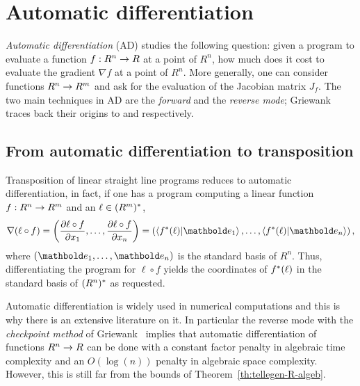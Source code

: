 

\section{Automatic differentiation}
\label{sec:autom-diff}

\emph{Automatic differentiation}
(AD) studies the following
question: given a program to evaluate a function $f:R^n\rightarrow R$ at a
point of $R^n$, how much does it cost to evaluate the gradient $\nabla
f$ at a point of $R^n$. More generally, one can consider functions
$R^n\rightarrow R^m$ and ask for the evaluation of the Jacobian matrix
$J_f$. The two main techniques in AD are the
\emph{forward}
and the
\emph{reverse
  mode}; Griewank~\cite{griewank2008evaluating} traces back their
origins to \cite{beda59} and \cite{ostrowski+al71} respectively.

\subsection{From automatic differentiation to transposition}
\label{sec:from-autom-diff}
Transposition of linear straight line programs reduces to automatic
differentiation, in fact, if one has a program computing a linear
function $f:R^n\rightarrow R^m$ and an $\ell\in(R^m)^\ast$,
\begin{equation}
  \label{eq:261}
  \nabla (\ell\circ f) =
  \left(\frac{\partial \ell\circ f}{\partial x_1},\ldots,\frac{\partial \ell\circ f}{\partial x_n}\right) =
  \left(\braket{\dual{f}(\ell)}{\basis{e}_1},\ldots,\braket{\dual{f}(\ell)}{\basis{e}_n}\right)
  \text{,}
\end{equation}
where $(\basis{e}_1,\ldots,\basis{e}_n)$ is the standard basis of
$R^n$. Thus, differentiating the program for $\ell\circ f$ yields the
coordinates of $f^\ast(\ell)$ in the standard basis of
$(R^n)^\ast$ as requested.

Automatic differentiation is widely used in numerical computations and
this is why there is an extensive literature on it. In particular the
reverse mode with the
\emph{checkpoint
  method} of Griewank~\cite{griewank92} implies that automatic
differentiation of functions $R^n\rightarrow R$ can be done with a constant
factor penalty in algebraic time complexity and an $O(\log(n))$
penalty in algebraic space complexity. However, this is still far from
the bounds of Theorem~\ref{th:tellegen-R-algeb}.

